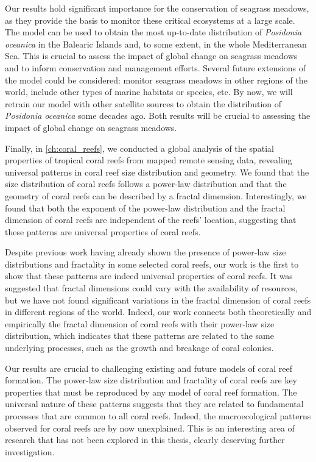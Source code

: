 Our results hold significant importance for the conservation of seagrass
meadows, as they provide the basis to monitor these critical ecosystems at a
large scale. The model can be used to obtain the most up-to-date distribution
of \textit{Posidonia oceanica} in the Balearic Islands and, to some extent, in
the whole Mediterranean Sea. This is crucial to assess the impact of global
change on seagrass meadows and to inform conservation and management efforts.
Several future extensions of the model could be considered:
monitor seagrass meadows in other regions of the world, include other types of
marine habitats or species, etc. By now, we will retrain our model with other
satellite sources to obtain the distribution of \textit{Posidonia oceanica}
some decades ago. Both results will be crucial to assessing the impact of
global
change on seagrass meadows.

Finally, in \cref{ch:coral_reefs}, we conducted a global analysis of the
spatial properties of tropical coral reefs from mapped remote sensing data,
revealing universal patterns in coral reef size distribution and geometry. We
found that the size distribution of coral reefs follows a power-law
distribution and that the geometry of coral reefs can be described by a fractal
dimension. Interestingly, we found that both the exponent of the power-law
distribution and the fractal dimension of coral reefs are independent of the
reefs' location, suggesting that these patterns are universal properties of
coral reefs.

Despite previous work having already shown the presence of power-law size
distributions and fractality in some selected coral reefs, our work is the
first to show that these patterns are indeed universal properties of coral
reefs. It was suggested that fractal dimensions could vary with the
availability of resources, but we have not found significant variations in the
fractal dimension of coral reefs in different regions of the world. Indeed, our
work connects both theoretically and empirically the fractal dimension of coral
reefs with their power-law size distribution, which indicates that these
patterns are related to the same underlying processes, such as the growth and
breakage of coral colonies.

Our results are crucial to challenging existing and future models of coral reef
formation. The power-law size distribution and fractality of coral reefs are
key properties that must be reproduced by any model of coral reef formation.
The universal nature of these patterns suggests that they are related to
fundamental processes that are common to all coral reefs. Indeed, the
macroecological patterns observed for coral reefs are by now unexplained. This
is an interesting area of research that has not been explored in this thesis,
clearly deserving further investigation.